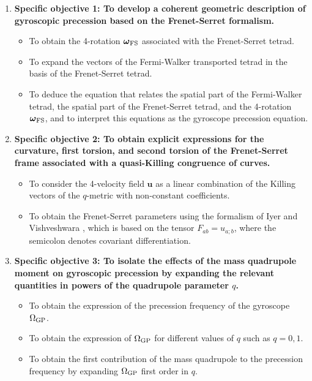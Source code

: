 \documentclass[12pt]{article}
\def\wfs{\mbi{\omega}_{\rm FS}}
\newcommand{\mbi}[1]{\boldsymbol{#1}}    %
\newcommand{\A}[1]{\bf A#1}              %
\begin{document}
\begin{enumerate}
	\item {\bf Specific objective 1: To develop a coherent geometric description of gyroscopic precession based on the Frenet-Serret formalism.}
	\begin{itemize}
		\item[\A{1}] To obtain the 4-rotation $\wfs$ associated with the Frenet-Serret tetrad.
		\item[\A{2}] To expand the vectors of the Fermi-Walker transported tetrad in the basis of the Frenet-Serret tetrad.
		\item[\A{3}] To deduce the equation that relates the spatial part of the Fermi-Walker tetrad, the spatial part of the Frenet-Serret tetrad, and the 4-rotation $\wfs$, and to interpret this equations as the gyroscope precession equation.
	\end{itemize}

	\item {\bf Specific objective 2: To obtain explicit expressions for the curvature, first torsion, and second torsion of the Frenet-Serret frame associated with a quasi-Killing congruence of curves.}
	\begin{itemize}
		\item[\A{4}] To consider the 4-velocity field $\mbi{u}$ as a linear combination of the Killing vectors of the $q$-metric with non-constant coefficients.
		\item[\A{5}] To obtain the Frenet-Serret parameters using the formalism of Iyer and Vishveshwara \cite{iyer1993frenet}, which is based on the tensor $F_{ab}=u_{a;b}$, where the semicolon denotes covariant differentiation. %
	\end{itemize}

	\item {\bf Specific objective 3: To isolate the effects of the mass quadrupole moment on gyroscopic precession by expanding the relevant quantities in powers of the quadrupole parameter $q$.}
	\begin{itemize}
		\item[\A{6}] To obtain the expression of the precession frequency of the gyroscope $\Omega_{\rm GP}$.
		\item[\A{7}] To obtain the expression of $\Omega_{\rm GP}$ for different values of $q$ such as $q=0,1$.
		\item[\A{8}] To obtain the first contribution of the mass quadrupole to the precession frequency by expanding $\Omega_{\rm GP}$ first order in $q$.
	\end{itemize}			
	


\end{enumerate}
\end{document}
